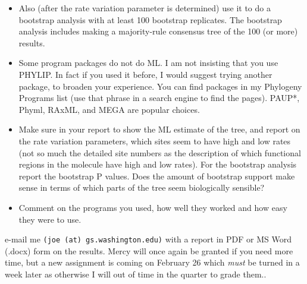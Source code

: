 \documentclass[12pt]{article}
\begin{document}
\begin{itemize}
\item Also (after the rate variation parameter is determined) use it
to do a bootstrap analysis with at least 100 bootstrap replicates.
The bootstrap analysis includes making a majority-rule consensus
tree of the 100 (or more) results.
\item Some program packages do not do ML.  I am not insisting that you use
PHYLIP.  In fact if you used it before, I would suggest trying another
package, to broaden your experience.   You can find packages in my Phylogeny 
Programs list (use that
phrase in a search engine to find the pages).  PAUP*, Phyml, RAxML, and MEGA
are popular choices.
\item Make sure in your report to show the ML estimate of the tree, and
report on the rate variation parameters, which sites seem to have high
and low rates (not so much the detailed site numbers as the description of
which functional regions in the molecule have high and low rates).  For the
bootstrap analysis report the bootstrap P values.   Does the amount of
bootstrap support make sense in terms of which parts of the tree seem
biologically sensible?
\item Comment on the programs you used, how well they worked and how easy they
were to use.
\end{itemize}
\bigskip

\noindent
e-mail me {\tt (joe (at) gs.washington.edu)} with a report in PDF or MS Word
(.docx) form on the results.   Mercy will once again be granted if you need
more time, but a new assignment is coming on February 26 which {\it must} be 
turned in a week later as otherwise I will out of time in the quarter to grade
them..
\vfill

\vfill
\end{document}
